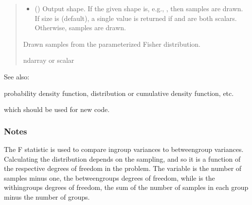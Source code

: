 \documentclass[letterpaper,10pt,english]{sphinxmanual}
\begin{document}
\begin{fulllineitems}
\begin{quote}
\begin{description}
\begin{itemize}
\item {} 
\sphinxAtStartPar
{} (\sphinxstyleliteralemphasis{\sphinxupquote{, }}) \textendash{} Output shape.  If the given shape is, e.g., , then
 samples are drawn.  If size is  (default),
a single value is returned if  and  are both scalars.
Otherwise,  samples are drawn.

\end{itemize}

\sphinxAtStartPar
{} \textendash{} Drawn samples from the parameterized Fisher distribution.

\sphinxAtStartPar
ndarray or scalar

\end{description}\end{quote}


\begin{sphinxseealso}{See also:}
\begin{description}
\sphinxAtStartPar
probability density function, distribution or cumulative density function, etc.

\sphinxAtStartPar
which should be used for new code.

\end{description}


\end{sphinxseealso}

\subsubsection*{Notes}

\sphinxAtStartPar
The F statistic is used to compare in\sphinxhyphen{}group variances to between\sphinxhyphen{}group
variances. Calculating the distribution depends on the sampling, and
so it is a function of the respective degrees of freedom in the
problem.  The variable  is the number of samples minus one, the
between\sphinxhyphen{}groups degrees of freedom, while  is the within\sphinxhyphen{}groups
degrees of freedom, the sum of the number of samples in each group
minus the number of groups.

\end{fulllineitems}
\end{document}
